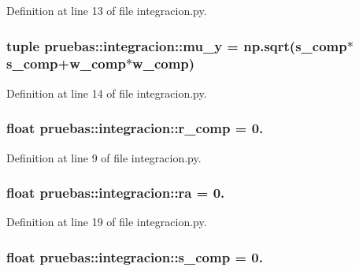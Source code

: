 \-Definition at line 13 of file integracion.\-py.

\subsubsection[{mu\-\_\-y}]{\setlength{\rightskip}{0pt plus 5cm}tuple {\bf pruebas\-::integracion\-::mu\-\_\-y} = np.\-sqrt({\bf s\-\_\-comp}$\ast${\bf s\-\_\-comp}+{\bf w\-\_\-comp}$\ast${\bf w\-\_\-comp})}\label{namespacepruebas_1_1integracion_a59d9c884c181869e4dd571fdf653f75f}


\-Definition at line 14 of file integracion.\-py.

\subsubsection[{r\-\_\-comp}]{\setlength{\rightskip}{0pt plus 5cm}float {\bf pruebas\-::integracion\-::r\-\_\-comp} = 0.}\label{namespacepruebas_1_1integracion_a8edbcf6dec3a706693d6398ee5b0bf16}


\-Definition at line 9 of file integracion.\-py.

\subsubsection[{ra}]{\setlength{\rightskip}{0pt plus 5cm}float {\bf pruebas\-::integracion\-::ra} = 0.}\label{namespacepruebas_1_1integracion_a2e5cf62e4529a81ddbf8647d5eb84931}


\-Definition at line 19 of file integracion.\-py.

\subsubsection[{s\-\_\-comp}]{\setlength{\rightskip}{0pt plus 5cm}float {\bf pruebas\-::integracion\-::s\-\_\-comp} = 0.}\label{namespacepruebas_1_1integracion_a656c6ef6a62a3570244ff05eda25d36b}


